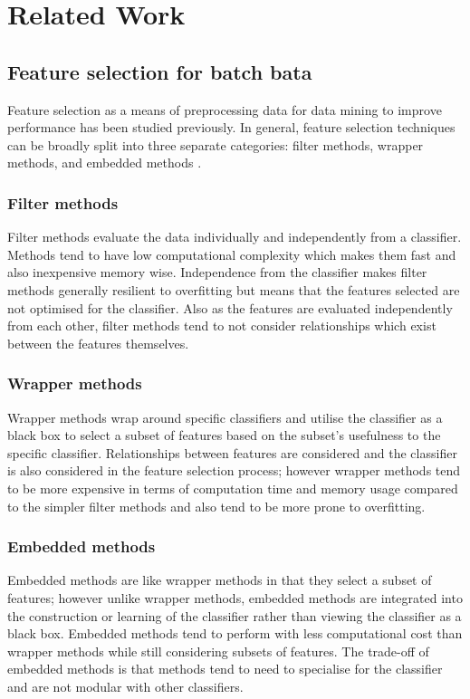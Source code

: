 \chapter{Related Work}
\label{chapter:RelatedWork}
\section{Feature selection for batch bata}

Feature selection as a means of preprocessing data for data mining to improve performance has been studied previously. In general, feature selection techniques can be broadly split into three separate categories: filter methods, wrapper methods, and embedded methods \citep{Guyon:2003:IVF:944919.944968}.

\subsection{Filter methods}
Filter methods evaluate the data individually and independently from a classifier. Methods tend to have low computational complexity which makes them fast and also inexpensive memory wise. Independence from the classifier makes filter methods generally resilient to overfitting but means that the features selected are not optimised for the classifier. Also as the features are evaluated independently from each other, filter methods tend to not consider relationships which exist between the features themselves.

\subsection{Wrapper methods}
Wrapper methods wrap around specific classifiers and utilise the classifier as a black box to select a subset of features based on the subset's usefulness to the specific classifier. Relationships between features are considered and the classifier is also considered in the feature selection process; however wrapper methods tend to be more expensive in terms of computation time and memory usage compared to the simpler filter methods and also tend to be more prone to overfitting.

\subsection{Embedded methods}
Embedded methods are like wrapper methods in that they select a subset of features; however unlike wrapper methods, embedded methods are integrated into the construction or learning of the classifier rather than viewing the classifier as a black box. Embedded methods tend to perform with less computational cost than wrapper methods while still considering subsets of features. The trade-off of embedded methods is that methods tend to need to specialise for the classifier and are not modular with other classifiers.

